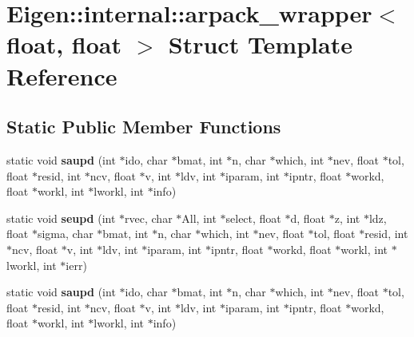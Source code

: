\hypertarget{struct_eigen_1_1internal_1_1arpack__wrapper_3_01float_00_01float_01_4}{}\section{Eigen\+:\+:internal\+:\+:arpack\+\_\+wrapper$<$ float, float $>$ Struct Template Reference}
\label{struct_eigen_1_1internal_1_1arpack__wrapper_3_01float_00_01float_01_4}
\subsection*{Static Public Member Functions}
\begin{DoxyCompactItemize}
\item 
\mbox{\label{struct_eigen_1_1internal_1_1arpack__wrapper_3_01float_00_01float_01_4_a87d37de8fee2bf8575738105078dc6ad}} 
static void {\bfseries saupd} (int $\ast$ido, char $\ast$bmat, int $\ast$n, char $\ast$which, int $\ast$nev, float $\ast$tol, float $\ast$resid, int $\ast$ncv, float $\ast$v, int $\ast$ldv, int $\ast$iparam, int $\ast$ipntr, float $\ast$workd, float $\ast$workl, int $\ast$lworkl, int $\ast$info)
\item 
\mbox{\label{struct_eigen_1_1internal_1_1arpack__wrapper_3_01float_00_01float_01_4_ad49524ccbbe2f6e5f2d3685c93712839}} 
static void {\bfseries seupd} (int $\ast$rvec, char $\ast$All, int $\ast$select, float $\ast$d, float $\ast$z, int $\ast$ldz, float $\ast$sigma, char $\ast$bmat, int $\ast$n, char $\ast$which, int $\ast$nev, float $\ast$tol, float $\ast$resid, int $\ast$ncv, float $\ast$v, int $\ast$ldv, int $\ast$iparam, int $\ast$ipntr, float $\ast$workd, float $\ast$workl, int $\ast$lworkl, int $\ast$ierr)
\item 
\mbox{\label{struct_eigen_1_1internal_1_1arpack__wrapper_3_01float_00_01float_01_4_a87d37de8fee2bf8575738105078dc6ad}} 
static void {\bfseries saupd} (int $\ast$ido, char $\ast$bmat, int $\ast$n, char $\ast$which, int $\ast$nev, float $\ast$tol, float $\ast$resid, int $\ast$ncv, float $\ast$v, int $\ast$ldv, int $\ast$iparam, int $\ast$ipntr, float $\ast$workd, float $\ast$workl, int $\ast$lworkl, int $\ast$info)

\end{DoxyCompactItemize}
